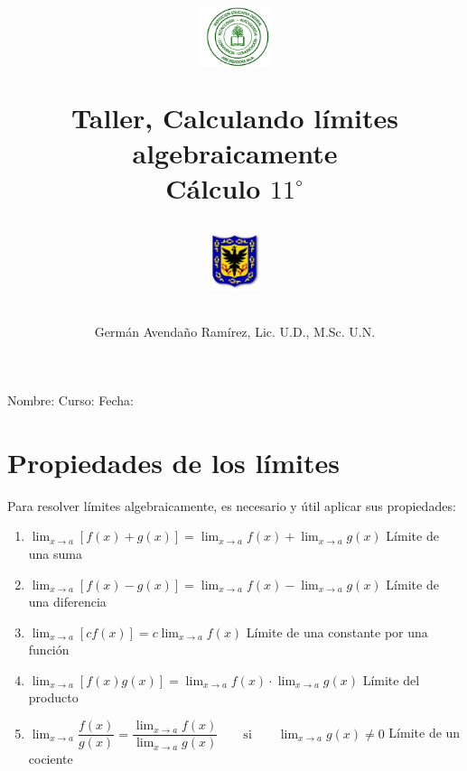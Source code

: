 \documentclass[10pt,twoside]{article}
\author{Germ\'an Avenda\~no Ram\'irez, Lic. U.D., M.Sc. U.N.}
\title{\begin{minipage}{.2\textwidth}
\includegraphics[height=1.75cm]{Images/logo-colegio.png}\end{minipage}
\begin{minipage}{.55\textwidth}
\begin{center}
Taller, Calculando límites algebraicamente\\
Cálculo $11^{\circ}$
\end{center}
\end{minipage}\hfill
\begin{minipage}{.2\textwidth}
\includegraphics[height=1.75cm]{Images/logo-sed.png} 
\end{minipage}}
\date{}
\begin{document}
\maketitle
Nombre: \hrulefill Curso: \underline{\hspace*{44pt}} Fecha: \underline{\hspace*{2.5cm}}
\section*{Propiedades de los l\'{i}mites}
Para resolver l\'{i}mites algebraicamente, es necesario y \'{u}til aplicar sus propiedades:
\begin{enumerate}
\item $\displaystyle{\lim_{x \rightarrow a}[f(x)+g(x)]=\lim_{x \rightarrow a}f(x)+\lim_{x\rightarrow a}g(x)}$ \hfill Límite de una suma
\item $\displaystyle{\lim_{x\rightarrow a}[f(x)-g(x)]=\lim_{x\rightarrow a}f(x)-\lim_{x\rightarrow a}g(x)}$ \hfill Límite de una diferencia
\item $\displaystyle{\lim_{x\rightarrow a}[cf(x)]=c\lim_{x\rightarrow a}f(x)}$ \hfill Límite de una constante por una función
\item $\displaystyle{\lim_{x\rightarrow a}[f(x)g(x)]=\lim_{x\rightarrow a}f(x)\cdot \lim_{x\rightarrow a}g(x)}$ \hfill Límite del producto
\item $\displaystyle{\lim_{x\rightarrow a}\dfrac{f(x)}{g(x)}}=\dfrac{\displaystyle{\lim_{x\rightarrow a}}f(x)}{\displaystyle{\lim_{x\rightarrow a}}g(x)} \qquad \text{si} \qquad \displaystyle{\lim_{x\rightarrow a}g(x)\neq 0}$ \hfill Límite de un cociente
\end{enumerate}
\end{document}
